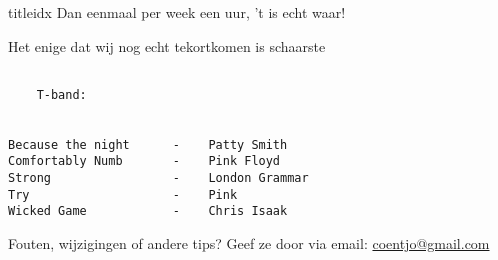 \documentclass[a4,openany,portrait,tikz]{article}
\begin{document}
\begin{songs}{titleidx}
			Dan eenmaal per week een uur, 't is echt waar!
		\endscripture

		Het enige dat wij nog echt tekortkomen is schaarste
		\endscripture










%	
\end{songs}





\begin{LARGE}
\begin{verbatim}

    T-band:


Because the night      -    Patty Smith
Comfortably Numb       -    Pink Floyd
Strong                 -    London Grammar
Try                    -    Pink
Wicked Game            -    Chris Isaak

\end{verbatim}
\end{LARGE}
\renewcommand{\thesongnum}{Jam}
	









%
%

Fouten, wijzigingen of andere tips? Geef ze door via email:   \href{mailto:coentjo@gmail.com}{coentjo@gmail.com}
\end{document}
